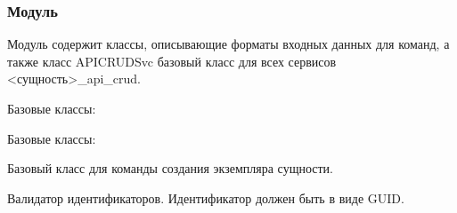 \documentclass[a4paper,10pt,russian]{sphinxmanual}
\begin{document}
\subsubsection{Модуль }
\label{\detokenize{developer:api-crud-svc}}
\sphinxAtStartPar
Модуль содержит классы, описывающие форматы входных данных для команд,
а также класс APICRUDSvc \sphinxhyphen{} базовый класс для всех сервисов
\textless{}сущность\textgreater{}\_api\_crud.


\begin{fulllineitems}

\pysigstartsignatures
{}
\pysigstopsignatures
\sphinxAtStartPar
Базовые классы: 

\end{fulllineitems}



\begin{fulllineitems}

\pysigstartsignatures
{}
\pysigstopsignatures
\sphinxAtStartPar
Базовые классы: 

\sphinxAtStartPar
Базовый класс для команды создания экземпляра сущности.


\begin{fulllineitems}

\pysigstartsignatures
{}
\pysigstopsignatures
\sphinxAtStartPar
Валидатор идентификаторов.
Идентификатор должен быть в виде GUID.

\end{fulllineitems}


\end{fulllineitems}
\end{document}
